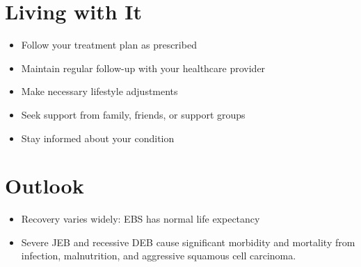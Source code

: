 \section{Living with It}
\begin{itemize}[noitemsep]
  \item Follow your treatment plan as prescribed
  \item Maintain regular follow-up with your healthcare provider
  \item Make necessary lifestyle adjustments
  \item Seek support from family, friends, or support groups
  \item Stay informed about your condition
\end{itemize}
\section{Outlook}
\begin{itemize}[noitemsep]
  \item Recovery varies widely: EBS has normal life expectancy
  \item Severe JEB and recessive DEB cause significant morbidity and mortality from infection, malnutrition, and aggressive squamous cell carcinoma.
\end{itemize}
